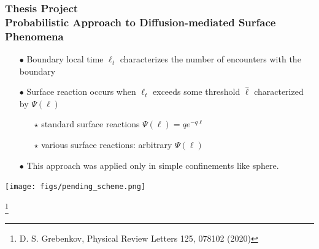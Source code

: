 \documentclass[9pt]{beamer}
\newcommand\blfootnote[1]{%
  \begingroup
  \renewcommand\thefootnote{}\footnote{#1}%
  \addtocounter{footnote}{-1}%
  \endgroup
}
\newcommand{\mrm}{\mathrm}
\newcommand{\tbf}{\textbf}
\begin{document}
\begin{frame}[fragile]
  \frametitle{\tbf{Thesis Project}\\
  \small{Probabilistic Approach to Diffusion-mediated Surface Phenomena}}


\large

	\begin{itemize}
	    	\setlength{\itemsep}{6pt}
		\item[$\bullet$] Boundary local time $\ell_t$ characterizes the number of encounters with the boundary
		\item[$\bullet$] Surface reaction occurs when $\ell_t$ exceeds some threshold $\hat\ell$ characterized by $\Psi(\ell)$
		\large
		\begin{itemize}
          \item[$\star$] standard surface reactions $\Psi(\ell) = q e^{-q\ell}$
          \item[$\star$]  various surface reactions: arbitrary $\Psi(\ell)$
        \end{itemize}
		\item[$\bullet$] This approach was applied only in simple confinements like sphere.
	\end{itemize}

\begin{center}
\texttt{[image: figs/pending\_scheme.png]}
\end{center}
  
  \blfootnote{D. S. Grebenkov, Physical Review Letters 125, 078102 (2020)}
  
  
\end{frame}
\end{document}
